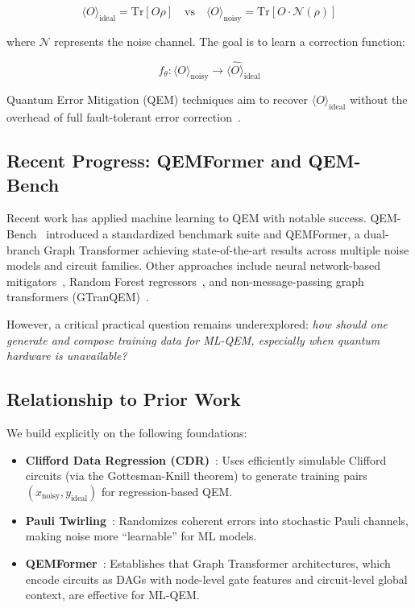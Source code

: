 \documentclass[11pt, a4paper]{article}
\begin{document}
\begin{equation}
\langle O \rangle_{\text{ideal}} = \text{Tr}[O\rho] \quad \text{vs} \quad
\langle O \rangle_{\text{noisy}} = \text{Tr}[O \cdot \mathcal{N}(\rho)]
\end{equation}

where $\mathcal{N}$ represents the noise channel. The goal is to learn a
correction function:

\begin{equation}
f_\theta: \langle O \rangle_{\text{noisy}} \rightarrow
\hat{\langle O \rangle}_{\text{ideal}}
\end{equation}

Quantum Error Mitigation (QEM) techniques aim to recover
$\langle O \rangle_{\text{ideal}}$ without the overhead of full fault-tolerant
error correction~\cite{cai2023qem, temme2017zne, li2017pec}.

\subsection{Recent Progress: QEMFormer and QEM-Bench}

Recent work has applied machine learning to QEM with notable success.
QEM-Bench~\cite{bao2025qemformer} introduced a standardized benchmark
suite and QEMFormer, a dual-branch Graph Transformer achieving
state-of-the-art results across multiple noise models and circuit families.
Other approaches include neural network-based mitigators~\cite{kim2020neuralqem,
strikis2021learning}, Random Forest regressors~\cite{liao2024rf}, and
non-message-passing graph transformers (GTranQEM)~\cite{bao2025gtranqem}.

However, a critical practical question remains underexplored: \emph{how should
one generate and compose training data for ML-QEM, especially when quantum
hardware is unavailable?}

\subsection{Relationship to Prior Work}

We build explicitly on the following foundations:

\begin{itemize}
    \item \textbf{Clifford Data Regression (CDR)}~\cite{czarnik2021cdr}:
    Uses efficiently simulable Clifford circuits (via the Gottesman-Knill
    theorem) to generate training pairs $(x_{\text{noisy}},
    y_{\text{ideal}})$ for regression-based QEM.
    
    \item \textbf{Pauli Twirling}~\cite{wallman2016twirling}: Randomizes
    coherent errors into stochastic Pauli channels, making noise more
    ``learnable'' for ML models.
    
    \item \textbf{QEMFormer}~\cite{bao2025qemformer}: Establishes that
    Graph Transformer architectures, which encode circuits as DAGs with
    node-level gate features and circuit-level global context, are
    effective for ML-QEM.
\end{itemize}
\end{document}
